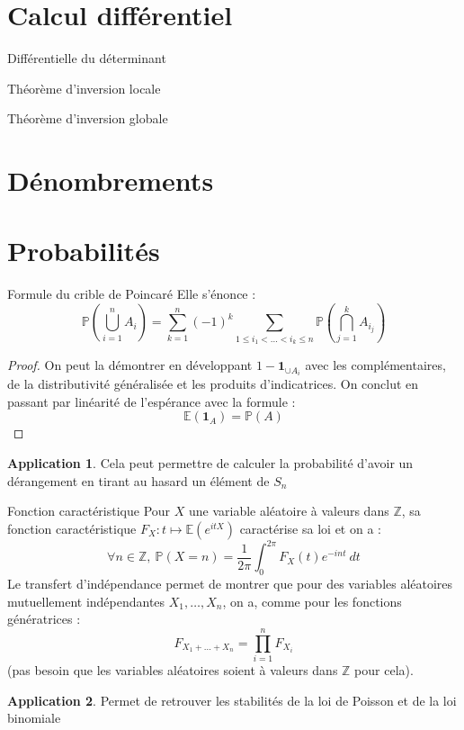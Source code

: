 \documentclass[french]{article}
\renewcommand{\P}{\mathbb{P}}
\newcommand{\Z}{\mathbb{Z}}
\newcommand{\E}{\mathbb{E}}
\theoremstyle{theorem}
\theoremstyle{definition}
\newtheorem*{app}{Application}
\begin{document}
\section{Calcul différentiel}

\begin{lem}{Différentielle du déterminant}
\end{lem}

\begin{lem}{Théorème d'inversion locale}
\end{lem}

\begin{lem}{Théorème d'inversion globale}
\end{lem}

\section{Dénombrements}

\section{Probabilités}

\begin{lem}{Formule du crible de Poincaré} Elle s'énonce : $$\P\left(\bigcup_{i=1}^{n}A_i\right)=\sum_{k=1}^{n}(-1)^k\sum_{1\leqslant i_1<\ldots<i_k\leqslant n}\P\left(\bigcap_{j=1}^{k}A_{i_j}\right)$$
\end{lem}
\begin{proof}
	On peut la démontrer en développant $1-\mathbf{1}_{\cup A_i}$ avec les complémentaires, de la distributivité généralisée et les produits d'indicatrices. On conclut en passant par linéarité de l'espérance avec la formule : $$\E(\mathbf{1}_A)=\P(A)$$
\end{proof}
\begin{app} Cela peut permettre de calculer la probabilité d'avoir un dérangement en tirant au hasard un élément de $S_n$
\end{app}

\begin{lem}{Fonction caractéristique} Pour $X$ une variable aléatoire à valeurs dans $\Z$, sa fonction caractéristique $F_X:t\mapsto\E(e^{itX})$ caractérise sa loi et on a : $$\forall n\in\Z,\ \P(X=n)=\frac{1}{2\pi}\int_{0}^{2\pi}F_X(t)e^{-int}\ dt$$ Le transfert d'indépendance permet de montrer que pour des variables aléatoires mutuellement indépendantes $X_1,\ldots,X_n$, on a, comme pour les fonctions génératrices : $$F_{X_1+\ldots+X_n}=\prod_{i=1}^{n}F_{X_i}$$ (pas besoin que les variables aléatoires soient à valeurs dans $\Z$ pour cela).
\end{lem}
\begin{app}
	Permet de retrouver les stabilités de la loi de Poisson et de la loi binomiale
\end{app}
\end{document}
